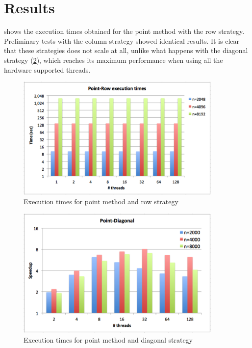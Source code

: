 \documentclass[../thesis]{subfiles}
\begin{document}
	\section{Results}
	\label{sec:multicore:results}

	 shows the execution times obtained for the point method with the row strategy. Preliminary tests with the column strategy showed identical results. It is clear that these strategies does not scale at all, unlike what happens with the diagonal strategy (\cref{fig:multicore:point:diagonal:times}), which reaches its maximum performance when using all the hardware supported threads.

	\begin{figure}[hp]
		\begin{center}
			\includegraphics[width=0.9\textwidth]{assets/images/multicore/point-row.png}
		\end{center}
		\caption{Execution times for point method and row strategy}
		\label{fig:multicore:point:row:times}
	\end{figure}

	\begin{figure}[hp]
		\begin{center}
			\includegraphics[width=0.9\textwidth]{assets/images/multicore/point-diagonal.png}
		\end{center}
		\caption{Execution times for point method and diagonal strategy}
		\label{fig:multicore:point:diagonal:times}
	\end{figure}
\end{document}
